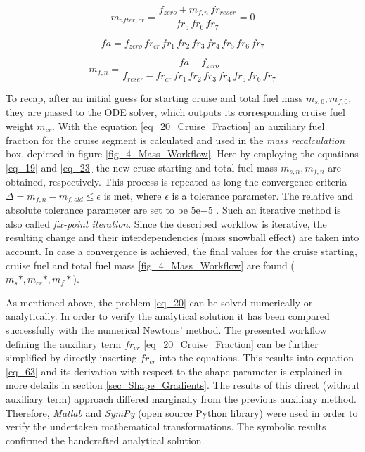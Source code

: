 \begin{equation}
    \label{eq_21}
    m_{after,cr} = \frac{f_{zero} + m_{f,n} \, fr_{reser}}
            {fr_5\, fr_6\, fr_7} = 0
\end{equation}

\begin{equation}
    \label{eq_22}
    fa = f_{zero} \, fr_{cr} \, fr_1 \, fr_2\,fr_3 \, fr_4 \, 
    fr_5\, fr_6\, fr_7
\end{equation}

\begin{equation}
    \label{eq_23}
    m_{f,n} = \frac{fa - f_{zero}}{f_{reser} -fr_{cr} 
    \,fr_1 \, fr_2\,fr_3 \, fr_4 \, 
    fr_5\, fr_6\, fr_7 }
\end{equation}



To recap, after an initial guess for
starting cruise and total fuel mass 
$m_{s,0}, m_{f,0}$, they are passed 
to the ODE solver, which outputs 
its corresponding cruise fuel weight $m_{cr}$.
With the equation \eqref{eq_20_Cruise_Fraction} 
an auxiliary fuel fraction for the cruise 
segment is calculated and used in the 
\emph{mass recalculation} box, depicted
 in figure \ref{fig_4_Mass_Workflow}.
Here by employing the equations \eqref{eq_19}
and \eqref{eq_23} the new cruse starting 
and total fuel mass $m_{s,n}, m_{f,n}$ are 
obtained, respectively.
This process is repeated as long 
the convergence criteria 
$\Delta =  m_{f,n} -  m_{f,old} \leq \epsilon$ is met, where 
$\epsilon$ is a tolerance parameter. 
The relative and absolute tolerance parameter are 
set to be $5\mathrm{e}{-5}$ \cite{noauthor_numpys_2021}.
Such an iterative method is also called \emph{fix-point iteration}.
Since the described workflow is iterative, the resulting 
change and their interdependencies  (mass snowball effect)
are taken into account.
In case a convergence is achieved, the final 
values for the cruise starting, cruise fuel and 
total fuel mass \ref{fig_4_Mass_Workflow}
are found ($m_{s}*, m_{cr}*, m_f*$).\newline

As mentioned above, the problem \eqref{eq_20} can 
be solved numerically or analytically. In order 
to verify the analytical solution it 
has been compared successfully with the 
numerical Newtons' method. The presented 
workflow defining the 
auxiliary term $fr_{cr}$ 
\eqref{eq_20_Cruise_Fraction} can be 
further simplified by directly inserting 
$fr_{cr}$ into the equations. This 
results into equation \eqref{eq_63} 
and its derivation with respect to 
the shape parameter is explained 
in more details in section \ref{sec_Shape_Gradients}. 
The results of 
this direct (without auxiliary term) 
approach differed marginally 
from the previous auxiliary method.
Therefore, \emph{Matlab} and \emph{SymPy}
(open source 
Python library) were used in order 
to verify the undertaken 
mathematical transformations. The 
symbolic results confirmed the handcrafted 
analytical solution.\newline


